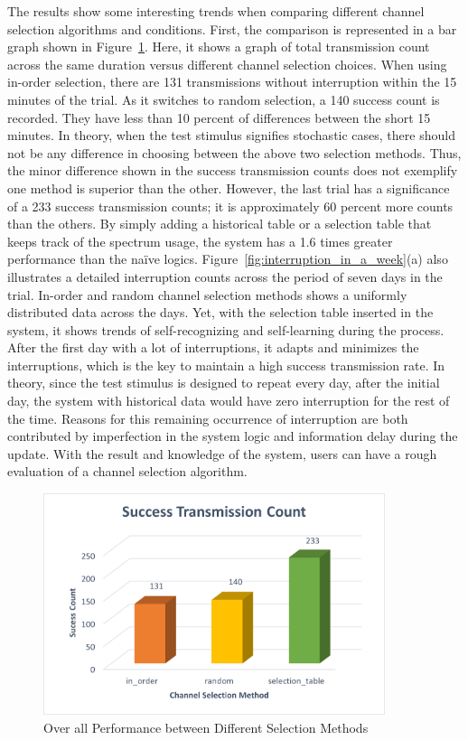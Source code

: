 The results show some interesting trends when comparing different channel selection algorithms and conditions. First, the comparison is represented in a bar graph shown in Figure~\ref{fig:performance_with_different_methods}. Here, it shows a graph of total transmission count across the same duration versus different channel selection choices. When using in-order selection, there are 131 transmissions without interruption within the 15 minutes of the trial. As it switches to random selection, a 140 success count is recorded. They have less than 10 percent of differences between the short 15 minutes. In theory, when the test stimulus signifies stochastic cases, there should not be any difference in choosing between the above two selection methods. Thus, the minor difference shown in the success transmission counts does not exemplify one method is superior than the other. However, the last trial has a significance of a 233 success transmission counts; it is approximately 60 percent more counts than the others. By simply adding a historical table or a selection table that keeps track of the spectrum usage, the system has a 1.6 times greater performance than the na\"ive logics. Figure~\ref{fig:interruption_in_a_week}(a) also illustrates a detailed interruption counts across the period of seven days in the trial. In-order and random channel selection methods shows a uniformly distributed data across the days. Yet, with the selection table inserted in the system, it shows trends of self-recognizing and self-learning during the process. After the first day with a lot of interruptions, it adapts and minimizes the interruptions, which is the key to maintain a high success transmission rate. In theory, since the test stimulus is designed to repeat every day, after the initial day, the system with historical data would have zero interruption for the rest of the time. Reasons for this remaining occurrence of interruption are both contributed by imperfection in the system logic and information delay during the update. With the result and knowledge of the system, users can have a rough evaluation of a channel selection algorithm.


\begin{figure}[ht]
\centering
\includegraphics[width=10cm]{figures/total_success_count.png}
\caption{Over all Performance between Different Selection Methods}
\label{fig:performance_with_different_methods}
\end{figure}

